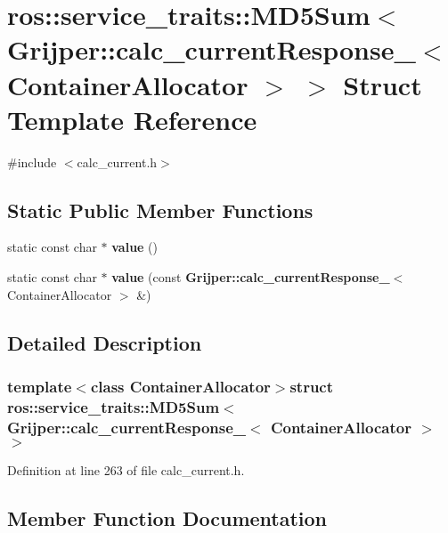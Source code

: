 \section{ros\-:\-:service\-\_\-traits\-:\-:M\-D5\-Sum$<$ Grijper\-:\-:calc\-\_\-current\-Response\-\_\-$<$ Container\-Allocator $>$ $>$ Struct Template Reference}
\label{structros_1_1service__traits_1_1MD5Sum_3_01Grijper_1_1calc__currentResponse___3_01ContainerAllocator_01_4_01_4}


{\ttfamily \#include $<$calc\-\_\-current.\-h$>$}

\subsection*{Static Public Member Functions}
\begin{DoxyCompactItemize}
\item 
static const char $\ast$ {\bf value} ()
\item 
static const char $\ast$ {\bf value} (const {\bf Grijper\-::calc\-\_\-current\-Response\-\_\-}$<$ Container\-Allocator $>$ \&)
\end{DoxyCompactItemize}


\subsection{Detailed Description}
\subsubsection*{template$<$class Container\-Allocator$>$struct ros\-::service\-\_\-traits\-::\-M\-D5\-Sum$<$ Grijper\-::calc\-\_\-current\-Response\-\_\-$<$ Container\-Allocator $>$ $>$}



Definition at line 263 of file calc\-\_\-current.\-h.



\subsection{Member Function Documentation}
